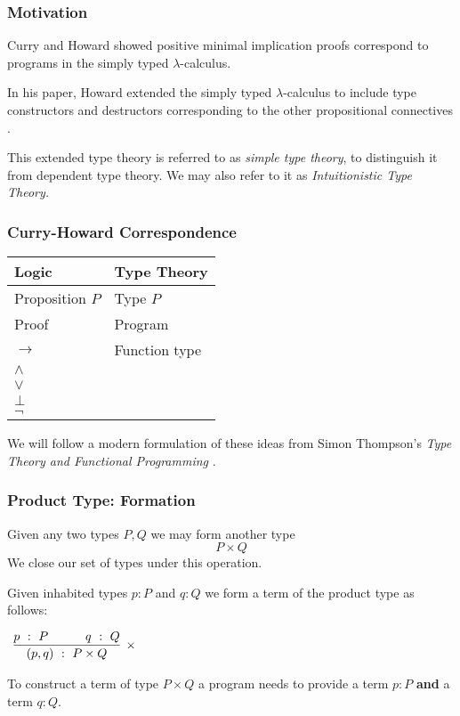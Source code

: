 \documentclass{beamer}
\theoremstyle{indentDefn} \newtheorem{defn}[]{Definition}
\begin{document}
\begin{frame}
  \frametitle{Motivation}

  Curry and Howard showed positive minimal implication proofs correspond to programs in the simply typed $\lambda$-calculus. 
  
  In his paper, Howard extended the simply typed $\lambda$-calculus to include type constructors and destructors corresponding to the other propositional connectives \cite{Howard1980}. 

  This extended type theory is referred to as \emph{simple type theory}, to distinguish it from dependent type theory. We may also refer to it as \emph{Intuitionistic Type Theory.} 
\end{frame}

\begin{frame}
  \frametitle{Curry-Howard Correspondence}

  \begin{center}
    \begin{tabular}{l|l}
      Logic & Type Theory \\
      \hline
      Proposition $P$ & Type $P$ \\
      Proof & Program \\
      $\to$ & Function type \\
      $\land$ &  \\
      $\lor$ & \\ 
      $\bot$ & \\
      $\lnot$
    \end{tabular}
  \end{center}

  We will follow a modern formulation of these ideas from Simon Thompson's \emph{Type Theory and Functional Programming} \cite{thompson}.
\end{frame}

\begin{frame}
  \frametitle{Product Type: Formation}

  Given any two types $P,Q$ we may form another type   
  $$P \times Q$$
  We close our set of types under this operation.

  Given inhabited types $p : P$ and $q : Q$ we form a term of the product type as follows: 

  \begin{center}
    $\begin{array}{c}		
      \infer[\times]{(p,q) \ : \ P \times Q}
        {p \ : \ P \quad & \quad q \ : \ Q}	
    \end{array}$
  \end{center}

  \vspace{0.5cm}

  To construct a term of type $P \times Q$ a program needs to provide a term $p :P$ {\bf and} a term $q : Q$. 

\end{frame}
\end{document}
